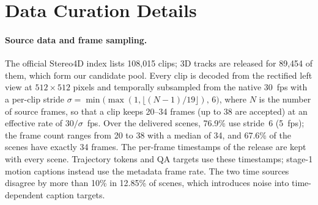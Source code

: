 
\section{Data Curation Details}
\label{app:data_curation}

\paragraph{Source data and frame sampling.}
The official Stereo4D index lists 108,015 clips; 3D tracks are released for 89,454 of them, which form our candidate pool.
Every clip is decoded from the rectified left view at $512\times512$ pixels and temporally subsampled from the native 30~fps with a per-clip stride $\sigma=\min\!\big(\max(1,\lfloor (N-1)/19\rfloor),\,6\big)$, where $N$ is the number of source frames, so that a clip keeps 20--34 frames (up to 38 are accepted) at an effective rate of $30/\sigma$~fps.
Over the delivered scenes, 76.9\% use stride~6 (5~fps); the frame count ranges from 20 to 38 with a median of 34, and 67.6\% of the scenes have exactly 34 frames.
The per-frame timestamps of the release are kept with every scene. Trajectory tokens and QA targets use these timestamps; stage-1 motion captions instead use the metadata frame rate. The two time sources disagree by more than 10\% in 12.85\% of scenes, which introduces noise into time-dependent caption targets.

